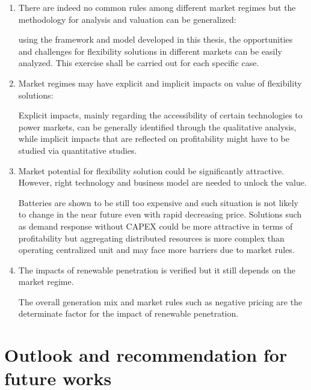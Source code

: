 \begin{enumerate}
	\item There are indeed no common rules among different market regimes but the methodology for analysis and valuation can be generalized:
	
	using the framework and model developed in this thesis, the opportunities and challenges for flexibility solutions in different markets can be easily analyzed. This exercise shall be carried out for each specific case.
	
	\item Market regimes may have explicit and implicit impacts on value of flexibility solutions:
	
	Explicit impacts, mainly regarding the accessibility of certain technologies to power markets, can be generally identified through the qualitative analysis, while implicit impacts that are reflected on profitability might have to be studied via quantitative studies.
	
	\item Market potential for flexibility solution could be significantly attractive. However, right technology and business model are needed to unlock the value.
	
	Batteries are shown to be still too expensive and such situation is not likely to change in the near future even with rapid decreasing price. Solutions such as demand response without CAPEX could be more attractive in terms of profitability but aggregating distributed resources is more complex than operating centralized unit and may face more barriers due to market rules.
	
	\item The impacts of renewable penetration is verified but it still depends on the market regime.
	
	The overall generation mix and market rules such as negative pricing are the determinate factor for the impact of renewable penetration.
	
	
\end{enumerate} 

\section{Outlook and recommendation for future works}

